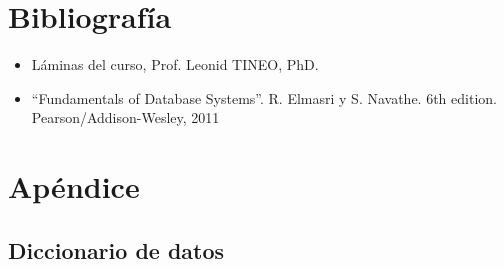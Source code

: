 \documentclass{article}
\begin{document}
\section{Bibliograf\'ia}

\begin{itemize}
\item L\'aminas del curso, Prof. Leonid TINEO, PhD.
\item “Fundamentals of Database Systems”. R. Elmasri y S. Navathe. 6th edition. Pearson/Addison-Wesley, 2011
\end{itemize}

\clearpage
\section{Ap\'endice}
\subsection{Diccionario de datos}
\end{document}
